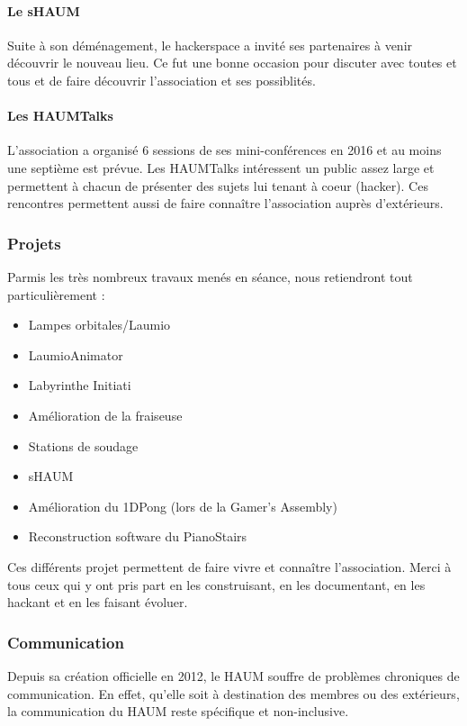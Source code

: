 \documentclass[11pt,twosided]{article}
\begin{document}
\paragraph{Le sHAUM} Suite à son déménagement, le hackerspace a invité ses partenaires à venir découvrir le nouveau lieu. Ce fut une bonne occasion pour discuter avec toutes et tous et de faire découvrir l'association et ses possiblités.

\paragraph{Les HAUMTalks} L'association a organisé 6 sessions de ses mini-conférences en 2016 et au moins une septième est prévue. Les HAUMTalks intéressent un public assez large et permettent à chacun de présenter des sujets lui tenant à coeur (hacker). Ces rencontres permettent aussi de faire connaître l'association auprès d'extérieurs.

\subsubsection{Projets}

Parmis les très nombreux travaux menés en séance, nous retiendront tout particulièrement :

\begin{itemize}
    \item Lampes orbitales/Laumio
    \item LaumioAnimator
    \item Labyrinthe Initiati
    \item Amélioration de la fraiseuse
    \item Stations de soudage
    \item sHAUM
    \item Amélioration du 1DPong (lors de la Gamer's Assembly)
    \item Reconstruction software du PianoStairs
\end{itemize}

Ces différents projet permettent de faire vivre et connaître l'association. Merci à tous ceux qui y ont pris part en les construisant, en les documentant, en les hackant et en les faisant évoluer.

\subsubsection{Communication}

Depuis sa création officielle en 2012, le HAUM souffre de problèmes chroniques de communication. En effet, qu'elle soit à destination des membres ou des extérieurs, la communication du HAUM reste spécifique et non-inclusive.
\end{document}
